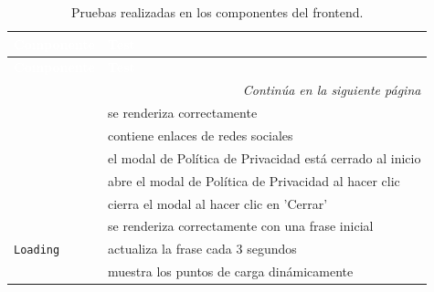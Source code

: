 \begin{longtable}{|p{5cm}|p{9cm}|}
    \caption{Pruebas realizadas en los componentes del frontend.} \label{tab:pruebas_componentes}                                  \\

    \hline
    \rowcolor[HTML]{E6B8CE}
    \textbf{\textcolor{white}{Componente}}          & \textbf{\textcolor{white}{Test}}                                             \\ \hline
    \endfirsthead

    \hline
    \rowcolor[HTML]{E6B8CE}
    \textbf{\textcolor{white}{Componente}}          & \textbf{\textcolor{white}{Test}}                                             \\ \hline
    \endhead

    \hline \multicolumn{2}{|r|}{\textit{Continúa en la siguiente página}}                                                          \\ \hline
    \endfoot

    \hline
    \endlastfoot

    \multirow{5}{*}{\texttt{Footer}}                & se renderiza correctamente                                                   \\ \cline{2-2}
                                                    & contiene enlaces de redes sociales                                           \\ \cline{2-2}
                                                    & el modal de Política de Privacidad está cerrado al inicio                    \\ \cline{2-2}
                                                    & abre el modal de Política de Privacidad al hacer clic                        \\ \cline{2-2}
                                                    & cierra el modal al hacer clic en 'Cerrar'                                    \\ \hline

    \multirow{3}{*}{\texttt{Loading}}               & se renderiza correctamente con una frase inicial                             \\ \cline{2-2}
                                                    & actualiza la frase cada 3 segundos                                           \\ \cline{2-2}
                                                    & muestra los puntos de carga dinámicamente                                    \\ \hline


\end{longtable}
